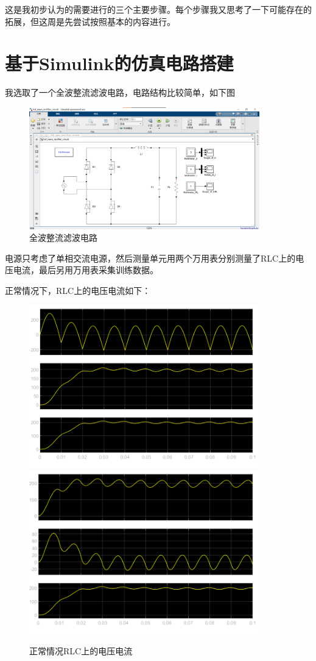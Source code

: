 \documentclass{article}
\begin{document}
	这是我初步认为的需要进行的三个主要步骤。每个步骤我又思考了一下可能存在的拓展，但这周是先尝试按照基本的内容进行。
	
	\section{基于Simulink的仿真电路搭建}
	
	我选取了一个全波整流滤波电路，电路结构比较简单，如下图
	
	\begin{figure}[h]
		\centering
		\includegraphics[width=10cm]{figure/full_wave_rectifier.png}
		\caption{全波整流滤波电路}
	\end{figure}
	
	电源只考虑了单相交流电源，然后测量单元用两个万用表分别测量了RLC上的电压电流，最后另用万用表采集训练数据。
	
	正常情况下，RLC上的电压电流如下：
	
	\begin{figure}[h]
		\centering
		\includegraphics[width=10cm]{figure/normal_U.png}
		\quad
		\includegraphics[width=10cm]{figure/normal_I.png}
		\caption{正常情况RLC上的电压电流}
	\end{figure}
	
\end{document}
